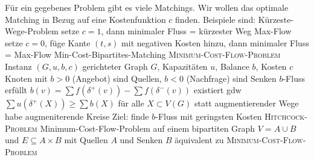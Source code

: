 \begin{outline}
    \0 Für ein gegebenes Problem gibt es viele Matchings. Wir wollen das optimale Matching in Bezug auf eine Kostenfunktion $c$ finden. 
        \1 Beispiele sind:
            \2 Kürzeste-Wege-Problem 
                \3 setze $c=1$, dann minimaler Fluss = kürzester Weg
            \2 Max-Flow 
                \3 setze $c=0$, füge Kante $(t,s)$ mit negativen Kosten hinzu, dann minimaler Fluss = Max-Flow
            \2 Min-Cost-Bipartites-Matching
    \1 \textsc{Minimum-Cost-Flow-Problem}
        \2 Instanz $(G,u,b,c)$
            \3 gerichteter Graph $G$, Kapazitäten $u$, Balance $b$, Kosten $c$
            \3 Knoten mit $b>0$ (Angebot) sind Quellen, $b<0$ (Nachfrage) sind Senken
        \2 $b$-Fluss 
            \3 erfüllt $b(v) = \sum f(\delta^+(v)) - \sum f(\delta^-(v))$ 
            \3 existiert gdw $\sum u(\delta^+(X)) \geq \sum b(X)$ für alle $X\subset V(G)$
            \3 statt augmentierender Wege habe augmeniterende Kreise
        \2 Ziel: finde $b$-Fluss mit geringsten Kosten
    \1 \textsc{Hitchcock-Problem}
        \2 Minimum-Cost-Flow-Problem auf einem bipartiten Graph $V=A\cup B$ und $E\subseteq A\times B$ mit Quellen $A$ und Senken $B$
        \2 äquivalent zu \textsc{Minimum-Cost-Flow-Problem}
        
\end{outline}


